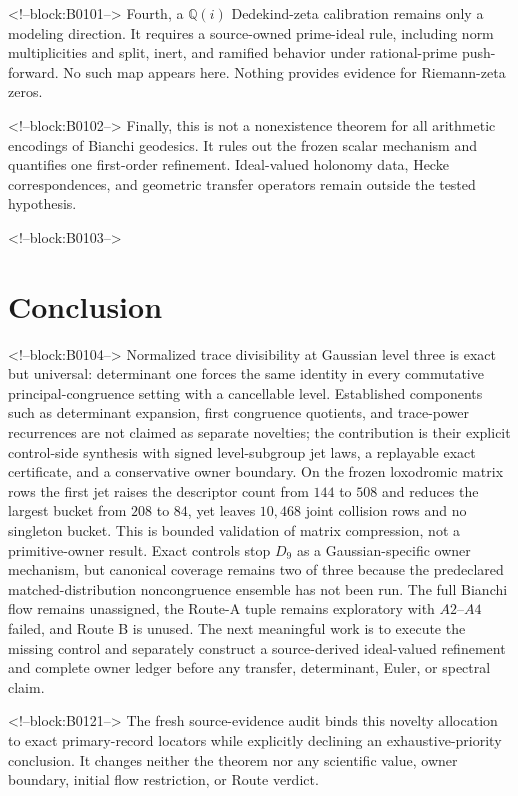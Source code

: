 \documentclass[11pt,a4paper]{article}
\theoremstyle{definition}
\theoremstyle{remark}
\begin{document}
<!--block:B0101-->
Fourth, a \(\mathbb Q(i)\) Dedekind-zeta calibration remains only a modeling direction. It requires a source-owned prime-ideal rule, including norm multiplicities and split, inert, and ramified behavior under rational-prime push-forward. No such map appears here. Nothing provides evidence for Riemann-zeta zeros.

<!--block:B0102-->
Finally, this is not a nonexistence theorem for all arithmetic encodings of Bianchi geodesics. It rules out the frozen scalar mechanism and quantifies one first-order refinement. Ideal-valued holonomy data, Hecke correspondences, and geometric transfer operators remain outside the tested hypothesis.

<!--block:B0103-->
\section{Conclusion}

<!--block:B0104-->
Normalized trace divisibility at Gaussian level three is exact but universal: determinant one forces the same identity in every commutative principal-congruence setting with a cancellable level. Established components such as determinant expansion, first congruence quotients, and trace-power recurrences are not claimed as separate novelties; the contribution is their explicit control-side synthesis with signed level-subgroup jet laws, a replayable exact certificate, and a conservative owner boundary. On the frozen loxodromic matrix rows the first jet raises the descriptor count from \(144\) to \(508\) and reduces the largest bucket from \(208\) to \(84\), yet leaves \(10{,}468\) joint collision rows and no singleton bucket. This is bounded validation of matrix compression, not a primitive-owner result. Exact controls stop \(D_9\) as a Gaussian-specific owner mechanism, but canonical coverage remains two of three because the predeclared matched-distribution noncongruence ensemble has not been run. The full Bianchi flow remains unassigned, the Route-A tuple remains exploratory with \(A2\)--\(A4\) failed, and Route B is unused. The next meaningful work is to execute the missing control and separately construct a source-derived ideal-valued refinement and complete owner ledger before any transfer, determinant, Euler, or spectral claim.

<!--block:B0121-->
The fresh source-evidence audit binds this novelty allocation to exact primary-record locators while explicitly declining an exhaustive-priority conclusion. It changes neither the theorem nor any scientific value, owner boundary, initial flow restriction, or Route verdict.
\end{document}
